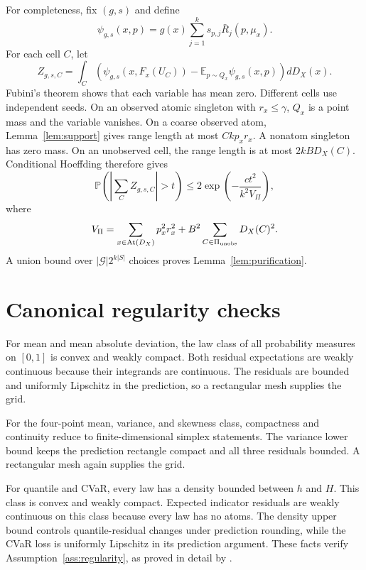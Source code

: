 \documentclass{article}
\theoremstyle{definition}
\theoremstyle{remark}
\newcommand{\E}{\mathbb E}
\newcommand{\Prb}{\mathbb P}
\newcommand{\1}{\mathbf 1}
\newcommand{\cG}{\mathcal G}
\newcommand{\At}{\operatorname{At}}
\begin{document}
For completeness, fix $(g,s)$ and define \[ \psi_{g,s}(x,p)=g(x)\sum_{j=1}^ks_{p,j}\bar R_j(p,\mu_x). \] For each cell $C$, let \[ Z_{g,s,C}=\int_C\left(\psi_{g,s}(x,F_x(U_C))- \E_{p\sim Q_x}\psi_{g,s}(x,p)\right)dD_X(x). \] Fubini's theorem shows that each variable has mean zero. Different cells use independent seeds. On an observed atomic singleton with $r_x\le\gamma$, $Q_x$ is a point mass and the variable vanishes. On a coarse observed atom, Lemma~\ref{lem:support} gives range length at most $Ckp_xr_x$. A nonatom singleton has zero mass. On an unobserved cell, the range length is at most $2kBD_X(C)$. Conditional Hoeffding therefore gives \[ \Prb\!\left(\left|\sum_CZ_{g,s,C}\right|>t\right) \le2\exp\!\left(-\frac{ct^2}{k^2V_\Pi}\right), \] where \[ V_\Pi=\sum_{x\in\At(D_X)}p_x^2r_x^2+ B^2\sum_{C\in\Pi_{\rm unobs}}D_X(C)^2. \] A union bound over $|\cG|2^{k|S|}$ choices proves Lemma~\ref{lem:purification}.

\section{Canonical regularity checks}\label{app:canonical}

For mean and mean absolute deviation, the law class of all probability measures on $[0,1]$ is convex and weakly compact. Both residual expectations are weakly continuous because their integrands are continuous. The residuals are bounded and uniformly Lipschitz in the prediction, so a rectangular mesh supplies the grid.

For the four-point mean, variance, and skewness class, compactness and continuity reduce to finite-dimensional simplex statements. The variance lower bound keeps the prediction rectangle compact and all three residuals bounded. A rectangular mesh again supplies the grid.

For quantile and CVaR, every law has a density bounded between $h$ and $H$. This class is convex and weakly compact. Expected indicator residuals are weakly continuous on this class because every law has no atoms. The density upper bound controls quantile-residual changes under prediction rounding, while the CVaR loss is uniformly Lipschitz in its prediction argument. These facts verify Assumption~\ref{ass:regularity}, as proved in detail by \citet{lu2026multilevel}.
\end{document}
